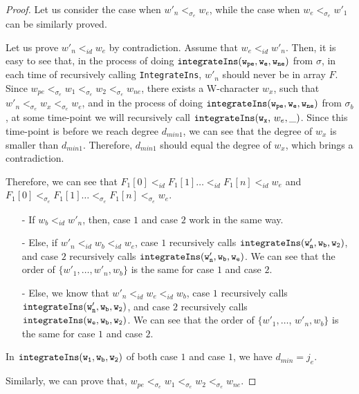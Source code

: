 \begin {proof}
Let us consider the case when $w'_n <_{\sigma_e} w_e$, while the case when $w_e <_{\sigma_e} w'_1$ can be similarly proved.

Let us prove $w'_n <_{id} w_e$ by contradiction. Assume that $w_e <_{id} w'_n$. Then, it is easy to see that, in the process of doing $\alabelshort[{\tt integrateIns}]{w_{pe},w_e,w_{ne}}$ from $\sigma$, in each time of recursively calling {\tt IntegrateIns}, $w'_n$ should never be in array $F$. Since $w_{pe} <_{\sigma_e} w_1 <_{\sigma_e} w_2 <_{\sigma_e} w_{ne}$, there exists a W-character $w_x$, such that $w'_n <_{\sigma_e} w_x <_{\sigma_e} w_e$, and in the process of doing $\alabelshort[{\tt integrateIns}]{w_{pe},w_e,w_{ne}}$ from $\sigma_b$, at some time-point we will recursively call $\alabelshort[{\tt integrateIns}]{w_x$, $w_e,\_}$. Since this time-point is before we reach degree $d_{min1}$, we can see that the degree of $w_x$ is smaller than $d_{min1}$. Therefore, $d_{min1}$ should equal the degree of $w_x$, which brings a contradiction.

Therefore, we can see that $F_1[0] <_{id} F_1[1] \ldots <_{id} F_1[n] <_{id} w_e$ and $F_1[0] <_{\sigma_e} F_1[1] \ldots <_{\sigma_e} F_1[n] <_{\sigma_e} w_e$.

\begin{itemize}
\setlength{\itemsep}{0.5pt}
\item[-] If $w_b <_{id} w'_n$, then, case $1$ and case $2$ work in the same way.

\item[-] Else, if $w'_n <_{id} w_b <_{id} w_e$, case $1$ recursively calls $\alabelshort[{\tt integrateIns}]{w'_n,w_b,w_2}$, and case $2$ recursively calls $\alabelshort[{\tt integrateIns}]{w'_n,w_b,w_e}$. We can see that the order of $\{ w'_1,\ldots,w'_n,w_b \}$ is the same for case $1$ and case $2$.

\item[-] Else, we know that $w'_n <_{id} w_e <_{id} w_b$, case $1$ recursively calls $\alabelshort[{\tt integrateIns}]{w'_n,w_b,w_2}$, and case $2$ recursively calls $\alabelshort[{\tt integrateIns}]{w_e,w_b,w_2}$. We can see that the order of $\{ w'_1,\ldots$, $w'_n,w_b \}$ is the same for case $1$ and case $2$.
\end{itemize}


 In $\alabelshort[{\tt integrateIns}]{w_1,w_b,w_2}$ of both case $1$ and case $1$, we have $d_{min} = j_e$.

Similarly, we can prove that, $w_{pe} <_{\sigma_e} w_1 <_{\sigma_e} w_2 <_{\sigma_e} w_{ne}$.


\end{proof}
